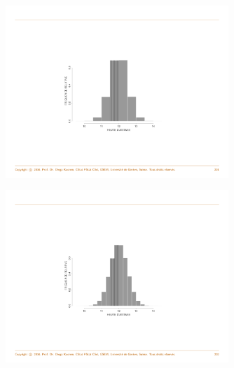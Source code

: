 \documentclass[notes=show,smaller]{beamer}\usepackage[]{graphicx}\usepackage[]{color}
\begin{document}
\begin{frame}{\secname}
  \begin{example}[continued]
  \begin{figure}[ptb]\centering
  \includegraphics[width=0.75\textwidth,height=0.75\textheight]{img/hist1.pdf}
  \end{figure}
  \end{example}
\end{frame}

\begin{frame}{\secname}
  \begin{example}[continued]
  \begin{figure}[ptb]\centering
  \includegraphics[width=0.75\textwidth,height=0.75\textheight]{img/hist2.pdf}
  \end{figure}
  \end{example}
\end{frame}
\end{document}
